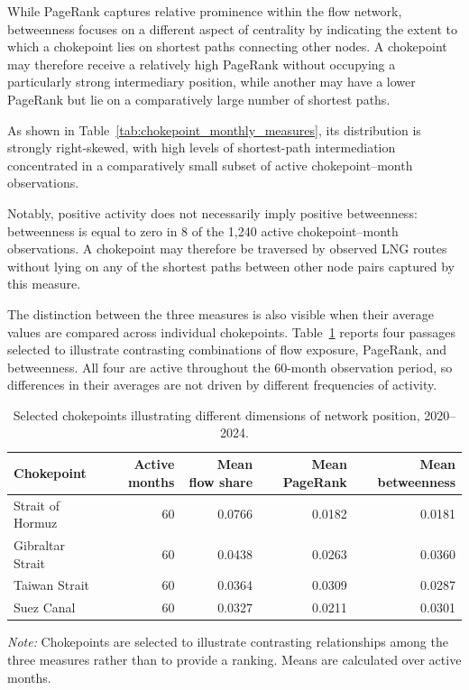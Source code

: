 \documentclass[pdftex,12pt,openright,a4paper,oneside]{book}
\begin{document}
While PageRank captures relative prominence within the flow network, betweenness focuses on a different aspect of centrality by indicating the extent to which a chokepoint lies on shortest paths connecting other nodes. 
A chokepoint may therefore receive a relatively high PageRank without occupying a particularly strong intermediary position, while another may have a lower PageRank but lie on a comparatively large number of shortest paths.

As shown in Table~\ref{tab:chokepoint_monthly_measures}, its distribution is strongly right-skewed, with high levels of shortest-path intermediation concentrated in a comparatively small subset of active chokepoint--month observations.

Notably, positive activity does not necessarily imply positive betweenness: betweenness is equal to zero in 8 of the 1,240 active chokepoint--month observations. A chokepoint may therefore be traversed by observed LNG routes without lying on any of the shortest paths between other node pairs captured by this measure.

The distinction between the three measures is also visible when their average values are compared across individual chokepoints. 
Table~\ref{tab:selected_chokepoint_positions} reports four passages selected to illustrate contrasting combinations of flow exposure, PageRank, and betweenness. All four are active throughout the 60-month observation period, so differences in their averages are not driven by different frequencies of activity.

\begin{table}[htbp]
\centering
\small
\setlength{\tabcolsep}{5pt}
\caption{Selected chokepoints illustrating different dimensions of network position, 2020--2024.}
\label{tab:selected_chokepoint_positions}
\begin{tabular}{lrrrr}
\toprule
Chokepoint & Active months & Mean flow share & Mean PageRank & Mean betweenness \tabularnewline
\midrule
Strait of Hormuz & 60 & 0.0766 & 0.0182 & 0.0181 \tabularnewline
Gibraltar Strait & 60 & 0.0438 & 0.0263 & 0.0360 \tabularnewline
Taiwan Strait & 60 & 0.0364 & 0.0309 & 0.0287 \tabularnewline
Suez Canal & 60 & 0.0327 & 0.0211 & 0.0301 \tabularnewline
\bottomrule
\end{tabular}

\medskip

\begin{minipage}{0.95\textwidth}
\footnotesize
\textit{Note:} Chokepoints are selected to illustrate contrasting relationships among the three measures rather than to provide a ranking. Means are calculated over active months.
\end{minipage}
\end{table}
\end{document}
